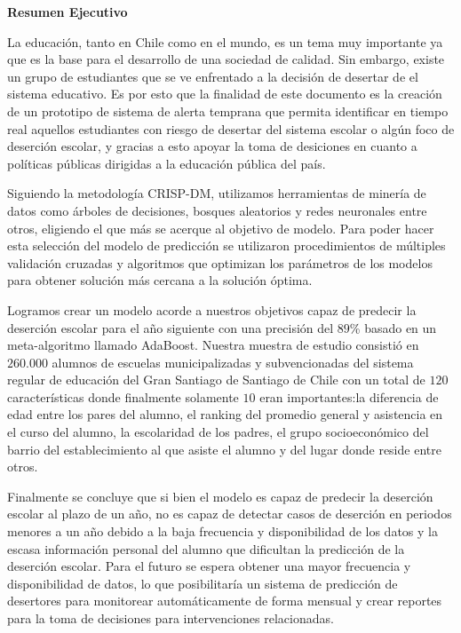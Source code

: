     \begin{center}
        \vspace*{1cm}
        
        \textbf{Resumen Ejecutivo}
        
        \vspace{0.5cm}
        
    \end{center}



La educación, tanto en Chile como en el mundo, es un tema muy importante ya que es la base para el desarrollo de una sociedad de calidad. Sin embargo, existe un grupo de estudiantes que se ve enfrentado a la decisión de desertar de el sistema educativo. Es por esto que la finalidad de este documento es la creación de un prototipo de sistema de alerta temprana que permita identificar en tiempo real aquellos estudiantes con riesgo de desertar del sistema escolar o algún foco de deserción escolar, y gracias a esto apoyar la toma de desiciones en cuanto a políticas públicas dirigidas a la educación pública del país.

Siguiendo la metodología CRISP-DM, utilizamos herramientas de minería de datos como árboles de decisiones, bosques aleatorios y redes neuronales entre otros, eligiendo el que más se acerque al objetivo de modelo. Para poder hacer esta selección del modelo de predicción se utilizaron procedimientos de múltiples validación cruzadas y algoritmos que optimizan los parámetros de los modelos para obtener solución más cercana a la solución óptima.

Logramos crear un modelo acorde a nuestros objetivos capaz de predecir la deserción escolar para el año siguiente con una precisión del $89$\% basado en un meta-algoritmo llamado AdaBoost. Nuestra muestra de estudio consistió en $260.000$ alumnos de escuelas municipalizadas y subvencionadas del sistema regular de educación del Gran Santiago de Santiago de Chile con un total de $120$ características donde finalmente solamente $10$ eran importantes:la diferencia de edad entre los pares del alumno, el ranking del promedio general y asistencia en el curso del alumno, la escolaridad de los padres, el grupo socioeconómico del barrio del establecimiento al que asiste el alumno y del lugar donde reside entre otros. 

Finalmente se concluye que si bien el modelo es capaz de predecir la deserción escolar al plazo de un año, no es capaz de detectar casos de deserción en periodos menores a un año debido a la baja frecuencia y disponibilidad de los datos y la escasa información personal del alumno que dificultan la predicción de la deserción escolar. Para el futuro se espera obtener una mayor frecuencia y disponibilidad de datos, lo que posibilitaría un sistema de predicción de desertores para monitorear automáticamente de forma mensual y crear reportes para la toma de decisiones para intervenciones relacionadas.
